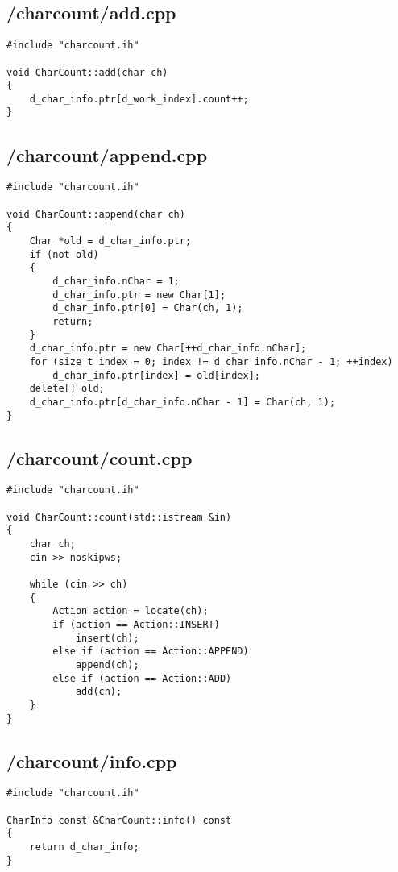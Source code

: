 \documentclass{article}
\begin{document}
\subsection*{/charcount/add.cpp}
\begin{verbatim}
#include "charcount.ih"

void CharCount::add(char ch)
{
    d_char_info.ptr[d_work_index].count++;
}
\end{verbatim}
\subsection*{/charcount/append.cpp}
\begin{verbatim}
#include "charcount.ih"

void CharCount::append(char ch)
{
    Char *old = d_char_info.ptr;
    if (not old)
    {
        d_char_info.nChar = 1;
        d_char_info.ptr = new Char[1];
        d_char_info.ptr[0] = Char(ch, 1);
        return;
    }
    d_char_info.ptr = new Char[++d_char_info.nChar];
    for (size_t index = 0; index != d_char_info.nChar - 1; ++index)
        d_char_info.ptr[index] = old[index];
    delete[] old;
    d_char_info.ptr[d_char_info.nChar - 1] = Char(ch, 1);
}

\end{verbatim}
\subsection*{/charcount/count.cpp}
\begin{verbatim}
#include "charcount.ih"

void CharCount::count(std::istream &in)
{
    char ch;
    cin >> noskipws;

    while (cin >> ch)
    {
        Action action = locate(ch);
        if (action == Action::INSERT)
            insert(ch);
        else if (action == Action::APPEND)
            append(ch);
        else if (action == Action::ADD)
            add(ch);
    }
}

\end{verbatim}
\subsection*{/charcount/info.cpp}
\begin{verbatim}
#include "charcount.ih"

CharInfo const &CharCount::info() const
{
    return d_char_info;
}
\end{verbatim}
\end{document}
